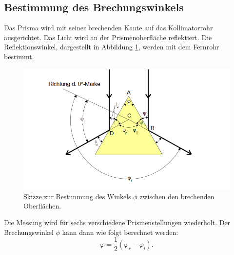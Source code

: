 \subsection{Bestimmung des Brechungswinkels}
Das Prisma wird mit seiner brechenden Kante auf das Kollimatorrohr ausgerichtet.
Das Licht wird an der Prismenoberfläche reflektiert.
Die Reflektionswinkel, dargestellt in Abbildung \ref{fig:phi}, werden mit dem Fernrohr bestimmt.
\begin{figure}[H]
  \centering
  \includegraphics[scale=0.5]{content/phi.png}
  \caption{Skizze zur Bestimmung des Winkels $\phi$ zwischen den brechenden Oberflächen\cite{v402}.}
  \label{fig:phi}
\end{figure}
\noindent Die Messung wird für sechs verschiedene Prismenstellungen wiederholt.
Der Brechungswinkel $\phi$ kann dann wie folgt berechnet werden:
\begin{equation}
  \label{eq:phi}
  \varphi = \frac{1}{2}(\varphi_r -\varphi_l) .
\end{equation}
